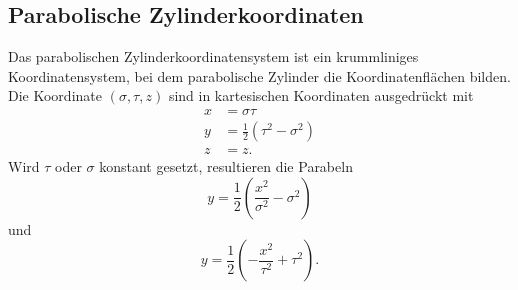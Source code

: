 \subsection{Parabolische Zylinderkoordinaten
\label{parzyl:subsection:finibus}}
Das parabolischen Zylinderkoordinatensystem \cite{parzyl:coordinates} ist ein krummliniges Koordinatensystem, 
bei dem parabolische Zylinder die Koordinatenflächen bilden.
Die Koordinate $(\sigma, \tau, z)$ sind in kartesischen Koordinaten ausgedrückt mit
\begin{align}
    x & = \sigma \tau \\
    \label{parzyl:coordRelationsa}
    y & = \frac{1}{2}\left(\tau^2 - \sigma^2\right) \\
    z & = z.
    \label{parzyl:coordRelationse}
\end{align}
Wird $\tau$ oder $\sigma$ konstant gesetzt, resultieren die Parabeln
\begin{equation}
    y = \frac{1}{2} \left( \frac{x^2}{\sigma^2} - \sigma^2 \right)
\end{equation}
und 
\begin{equation}
    y = \frac{1}{2} \left( -\frac{x^2}{\tau^2} + \tau^2 \right).
\end{equation}

